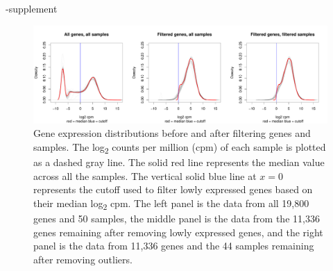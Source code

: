 \documentclass[fleqn,10pt]{wlscirep}
\begin{document}
\begin{filecontents}{\jobname-supplement}
\begin{figure}[ht]
\centering
\includegraphics[width=\linewidth]{../figure/gene-exp-distribution.pdf}
\caption{
Gene expression distributions before and after filtering genes and
samples. The log\textsubscript{2} counts per million (cpm) of each
sample is plotted as a dashed gray line. The solid red line represents
the median value across all the samples. The vertical solid blue line
at $x = 0$ represents the cutoff used to filter lowly expressed genes
based on their median log\textsubscript{2} cpm. The left panel is the
data from all 19,800 genes and 50 samples, the middle panel is the
data from the 11,336 genes remaining after removing lowly expressed
genes, and the right panel is the data from 11,336 genes and the 44
samples remaining after removing outliers.
}
\label{fig:gene}
\end{figure}


\end{filecontents}
\end{document}
